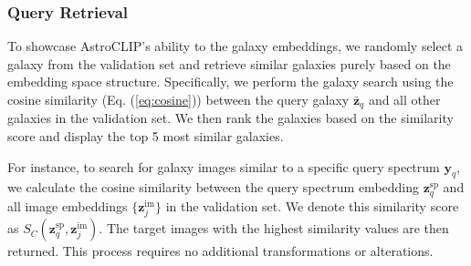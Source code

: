 \documentclass[a4paper,12pt]{article}
\begin{document}
\subsubsection{Query Retrieval}


To showcase AstroCLIP's ability to the galaxy embeddings, we randomly select a galaxy from the validation set and retrieve similar galaxies purely based on the embedding space structure. Specifically, we perform the galaxy search using the cosine similarity (Eq. (\ref{eq:cosine})) between the query galaxy $\bar{\mathbf{z}}_q$ and all other galaxies in the validation set. We then rank the galaxies based on the similarity score and display the top 5 most similar galaxies.

For instance, to search for galaxy images similar to a specific query spectrum $\mathbf{y}_q$, we calculate the cosine similarity between the query spectrum embedding $\mathbf{z}^{\text{sp}}_q$ and all image embeddings $\{ \mathbf{z}^{\text{im}}_j \}$ in the validation set. We denote this similarity score as $S_C(\mathbf{z}^{\text{sp}}_q, \mathbf{z}^{\text{im}}_j)$. The target images with the highest similarity values are then returned. This process requires no additional transformations or alterations.
\end{document}

